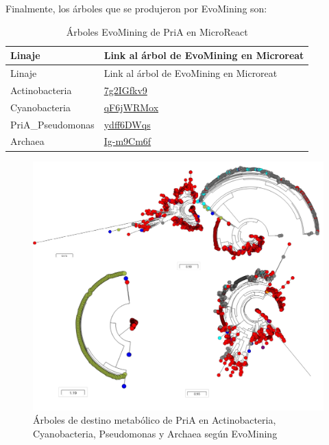 \documentclass[12pt,twoside]{reedthesis}
\begin{document}
  Finalmente, los árboles que se produjeron por EvoMining son:
  
  \begin{longtable}[]{@{}ll@{}}
  \caption{Árboles EvoMining de PriA en MicroReact
  \label{tab:inher}}\tabularnewline
  \toprule
  Linaje & Link al árbol de EvoMining en Microreat\tabularnewline
  \midrule
  \endfirsthead
  \toprule
  Linaje & Link al árbol de EvoMining en Microreat\tabularnewline
  \midrule
  \endhead
  Actinobacteria &
  \href{https://microreact.org/project/7g2IGfkv9}{7g2IGfkv9}\tabularnewline
  Cyanobacteria &
  \href{https://microreact.org/project/qF6jWRMox}{qF6jWRMox}\tabularnewline
  PriA\_Pseudomonas &
  \href{https://microreact.org/project/ydff6DWqs}{ydff6DWqs}\tabularnewline
  Archaea &
  \href{https://microreact.org/project/Ig-m9Cm6f}{Ig-m9Cm6f}\tabularnewline
  \bottomrule
  \end{longtable}
  
  \begin{figure}[h!tbp]
  \centering
  \includegraphics[angle = 0,scale = 1]{chapter4/PriAEvoMining.pdf}
  \caption[Árboles de destino metabólico de PriA en Actinobacteria, Cyanobacteria, Pseudomonas y Archaea según EvoMining]{\normalsize{Árboles de destino metabólico de PriA en Actinobacteria, Cyanobacteria, Pseudomonas y Archaea según EvoMining}}
  \label{fig:Árboles de destino metabólico de PriA en Actinobacteria, Cyanobacteria, Pseudomonas y Archaea según EvoMining}
  \end{figure}
  
\end{document}
